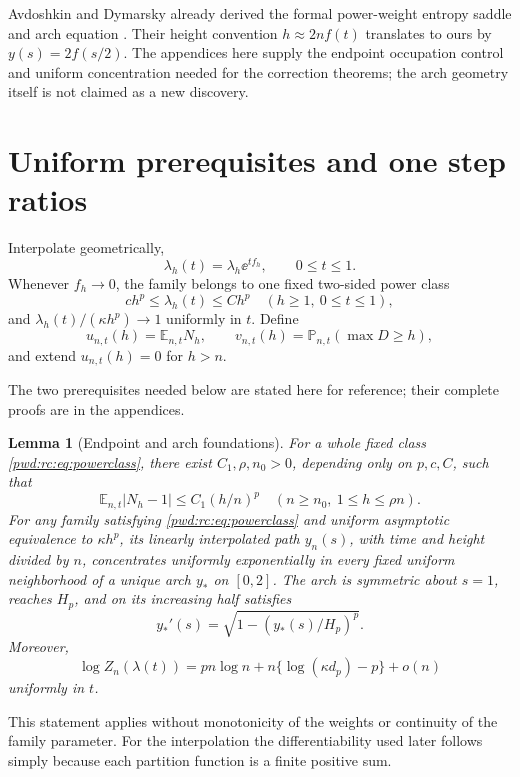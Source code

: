 \documentclass[11pt,letterpaper]{article}
\numberwithin{equation}{section}
\newtheorem{lemma}[theorem]{Lemma}
\theoremstyle{remark}\newtheorem{remark}[theorem]{Remark}
\newcommand{\E}{\mathbb E}\newcommand{\Prob}{\mathbb P}
\begin{document}
Avdoshkin and Dymarsky already derived the formal power-weight entropy saddle and arch equation \cite[Appendix C]{avdoshkin}. Their height convention $h\approx2nf(t)$ translates to ours by $y(s)=2f(s/2)$. The appendices here supply the endpoint occupation control and uniform concentration needed for the correction theorems; the arch geometry itself is not claimed as a new discovery.

\section{Uniform prerequisites and one step ratios}\label{pwd:rc:sec:prerequisites}
Interpolate geometrically,
\begin{equation}\label{pwd:rc:eq:interpolation}
 \lambda_h(t)=\lambda_h\ee^{t f_h},\qquad 0\le t\le1.
\end{equation}
Whenever $f_h\to0$, the family belongs to one fixed two-sided power class
\begin{equation}\label{pwd:rc:eq:powerclass}
 c h^p\le\lambda_h(t)\le C h^p\quad(h\ge1,\ 0\le t\le1),
\end{equation}
and $\lambda_h(t)/(\kappa h^p)\to1$ uniformly in $t$. Define
\[
 u_{n,t}(h)=\E_{n,t}N_h,\qquad
 v_{n,t}(h)=\Prob_{n,t}(\max D\ge h),
\]
and extend $u_{n,t}(h)=0$ for $h>n$.

The two prerequisites needed below are stated here for reference; their complete proofs are in the appendices.
\begin{lemma}[Endpoint and arch foundations]\label{pwd:rc:lem:foundations}
For a whole fixed class \eqref{pwd:rc:eq:powerclass}, there exist $C_1,\rho,n_0>0$, depending only on $p,c,C$, such that
\begin{equation}\label{pwd:rc:eq:endpoint-bound}
 \E_{n,t}|N_h-1|\le C_1(h/n)^p\quad(n\ge n_0,\ 1\le h\le\rho n).
\end{equation}
For any family satisfying \eqref{pwd:rc:eq:powerclass} and uniform asymptotic equivalence to $\kappa h^p$, its linearly interpolated path $y_n(s)$, with time and height divided by $n$, concentrates uniformly exponentially in every fixed uniform neighborhood of a unique arch $y_*$ on $[0,2]$. The arch is symmetric about $s=1$, reaches $H_p$, and on its increasing half satisfies
\begin{equation}\label{pwd:rc:eq:arch-ode}
 y_*'(s)=\sqrt{1-(y_*(s)/H_p)^p}.
\end{equation}
Moreover,
\begin{equation}\label{pwd:rc:eq:free-energy-main}
 \log Z_n(\lambda(t))
 =pn\log n+n\{\log(\kappa d_p)-p\}+o(n)
\end{equation}
uniformly in $t$.
\end{lemma}
This statement applies without monotonicity of the weights or continuity of the family parameter. For the interpolation the differentiability used later follows simply because each partition function is a finite positive sum.
\end{document}
